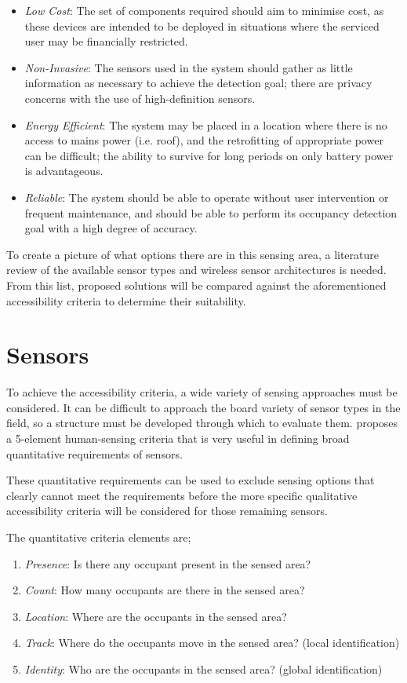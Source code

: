 \documentclass[../thesis/thesis.tex]{subfiles}
\begin{document}
\begin{itemize}
 \item \emph{Low Cost}: The set of components required should aim to minimise cost, as these devices are intended to be deployed in situations where the serviced user may be financially restricted.
 
 \item \emph{Non-Invasive}: The sensors used in the system should gather as little information as necessary to achieve the detection goal; there are privacy concerns with the use of high-definition sensors.
 
 \item \emph{Energy Efficient}: The system may be placed in a location where there is no access to mains power (i.e. roof), and the retrofitting of appropriate power can be difficult; the ability to survive for long periods on only battery power is advantageous.
 
 \item \emph{Reliable}: The system should be able to operate without user intervention or frequent maintenance, and should be able to perform its occupancy detection goal with a high degree of accuracy.
\end{itemize}

To create a picture of what options there are in this sensing area, a literature review of the available sensor types and wireless sensor architectures is needed. From this list, proposed solutions will be compared against the aforementioned accessibility criteria to determine their suitability.

\section{Sensors}
\label{sec:litreview:sensors}

To achieve the accessibility criteria, a wide variety of sensing approaches must be considered. It can be difficult to approach the board variety of sensor types in the field, so a structure must be developed through which to evaluate them. \cite{teixeira2010survey} proposes a 5-element human-sensing criteria that is very useful in defining broad quantitative requirements of sensors.

These quantitative requirements can be used to exclude sensing options that clearly cannot meet the requirements before the more specific qualitative accessibility criteria will be considered for those remaining sensors. 

The quantitative criteria elements are;
\begin{enumerate}
 \item \emph{Presence}: Is there any occupant present in the sensed area?
 \item \emph{Count}: How many occupants are there in the sensed area?
 \item \emph{Location}: Where are the occupants in the sensed area?
 \item \emph{Track}: Where do the occupants move in the sensed area? (local identification)
 \item \emph{Identity}: Who are the occupants in the sensed area? (global identification)
\end{enumerate}
\end{document}
